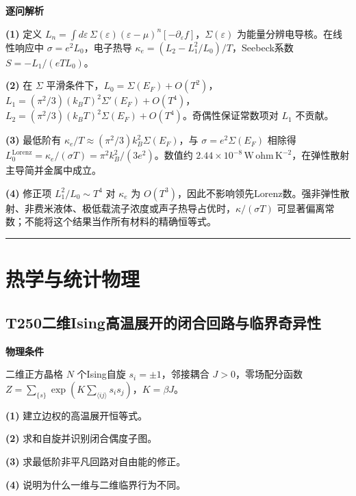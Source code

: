 \documentclass[UTF8,a4paper,11pt,oneside,openany]{ctexbook}
\begin{document}
\par\medskip\noindent\textbf{逐问解析}
\par\noindent\textbf{(1)} 定义 \(L_n=\int d\varepsilon\,\Sigma(\varepsilon)(\varepsilon-\mu)^n[-\partial_\varepsilon f]\)，\(\Sigma(\varepsilon)\) 为能量分辨电导核。在线性响应中 \(\sigma=e^2L_0\)，电子热导 \(\kappa_e=(L_2-L_1^2/L_0)/T\)，Seebeck系数 \(S=-L_1/(eTL_0)\)。
\par\noindent\textbf{(2)} 在 \(\Sigma\) 平滑条件下，\(L_0=\Sigma(E_F)+O(T^2)\)，\(L_1=(\pi^2/3)(k_BT)^2\Sigma'(E_F)+O(T^4)\)，\(L_2=(\pi^2/3)(k_BT)^2\Sigma(E_F)+O(T^4)\)。奇偶性保证常数项对 \(L_1\) 不贡献。
\par\noindent\textbf{(3)} 最低阶有 \(\kappa_e/T\approx(\pi^2/3)k_B^2\Sigma(E_F)\)，与 \(\sigma=e^2\Sigma(E_F)\) 相除得 \(L_0^{\mathrm{Lorenz}}=\kappa_e/(\sigma T)=\pi^2k_B^2/(3e^2)\)。数值约 \(2.44\times10^{-8}\,\mathrm{W\,\mathrm{ohm}\,K^{-2}}\)，在弹性散射主导简并金属中成立。
\par\noindent\textbf{(4)} 修正项 \(L_1^2/L_0\sim T^4\) 对 \(\kappa_e\) 为 \(O(T^3)\)，因此不影响领先Lorenz数。强非弹性散射、非费米液体、极低载流子浓度或声子热导占优时，\(\kappa/(\sigma T)\) 可显著偏离常数；不能将这个结果当作所有材料的精确恒等式。

\par\bigskip\hrule\bigskip
\chapter{热学与统计物理}
\section*{T250\quad 二维Ising高温展开的闭合回路与临界奇异性}
\textbf{物理条件}\par 二维正方晶格 \(N\) 个Ising自旋 \(s_i=\pm1\)，邻接耦合 \(J>0\)，零场配分函数 \(Z=\sum_{\{s\}}\exp(K\sum_{\langle ij\rangle}s_is_j)\)，\(K=\beta J\)。
\par\noindent\textbf{(1)} 建立边权的高温展开恒等式。
\par\noindent\textbf{(2)} 求和自旋并识别闭合偶度子图。
\par\noindent\textbf{(3)} 求最低阶非平凡回路对自由能的修正。
\par\noindent\textbf{(4)} 说明为什么一维与二维临界行为不同。
\end{document}
